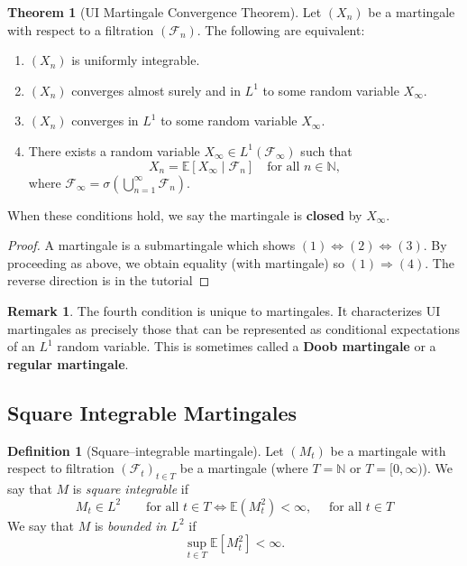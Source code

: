 \documentclass[11pt,a4paper]{article}
\theoremstyle{definition}
\newtheorem{definition}{Definition}[section]
\newtheorem{theorem}{Theorem}[section]
\newtheorem{remark}{Remark}[section]
\begin{document}
\begin{theorem}[UI Martingale Convergence Theorem]
Let $(X_n)$ be a martingale with respect to a filtration $(\mathcal{F}_n)$. The following are equivalent:
\begin{enumerate}
    \item $(X_n)$ is uniformly integrable.
    
    \item $(X_n)$ converges almost surely and in $L^1$ to some random variable $X_\infty$.
    
    \item $(X_n)$ converges in $L^1$ to some random variable $X_\infty$.
    
    \item There exists a random variable $X_\infty \in L^1(\mathcal{F}_\infty)$ such that
    \[
    X_n = \mathbb{E}[X_\infty \mid \mathcal{F}_n] \quad \text{for all } n \in \mathbb{N},
    \]
    where $\mathcal{F}_\infty = \sigma\left(\bigcup_{n=1}^\infty \mathcal{F}_n\right)$.
\end{enumerate}
When these conditions hold, we say the martingale is \textbf{closed} by $X_\infty$.
\end{theorem}

\begin{proof}
    A martingale is a submartingale which shows $(1) \iff (2) \iff (3)$. By proceeding as above, we obtain equality (with martingale) so $(1) \Longrightarrow (4)$. The reverse direction is in the tutorial
\end{proof}

\begin{remark}
The fourth condition is unique to martingales. It characterizes UI martingales as precisely those that can be represented as conditional expectations of an $L^1$ random variable. This is sometimes called a \textbf{Doob martingale} or a \textbf{regular martingale}.
\end{remark}


\subsection{Square Integrable Martingales}

\begin{definition}[Square--integrable martingale]
Let $(M_t)$ be a martingale with respect to filtration $(\mathcal{F}_t)_{t\in T}$ be a martingale (where $T=\mathbb{N}$ 
or $T=[0,\infty)$).  
We say that $M$ is \emph{square integrable} if
\[
M_t \in L^2 \qquad \text{for all } t\in T \iff \mathbb{E}(M_t^2) < \infty, \quad \text{ for all } t \in T
\]
We say that $M$ is \emph{bounded in $L^2$} if
\[
\sup_{t\in T} \mathbb{E}[M_t^2] < \infty.
\]
\end{definition}
\end{document}
